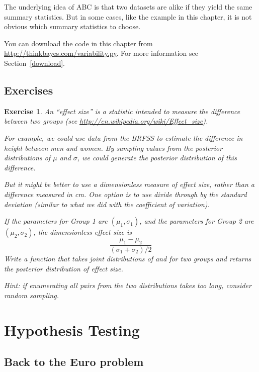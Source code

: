 \documentclass[12pt]{book}
\theoremstyle{exercise}
\newtheorem{exercise}{Exercise}[chapter]
\begin{document}
The underlying idea of ABC is that two datasets are alike if they yield
the same summary statistics.  But in some cases, like the example in
this chapter, it is not obvious which summary statistics to choose.

You can download the code in this chapter from
\url{http://thinkbayes.com/variability.py}.
  For more information
see Section~\ref{download}.

\section{Exercises}

\begin{exercise}

An ``effect size'' is a statistic intended to measure the difference
between two groups (see
\url{http://en.wikipedia.org/wiki/Effect_size}).

For example, we could use data from the BRFSS to estimate the
difference in height between men and women.  By sampling values
from the posterior distributions of $\mu$ and
$\sigma$, we could generate the posterior distribution of this
difference.

But it might be better to use a dimensionless measure of effect
size, rather than a difference measured in cm.  One option is
to use divide through by the standard deviation (similar to what
we did with the coefficient of variation).

If the parameters for Group 1 are $(\mu_1, \sigma_1)$, and the
parameters for Group 2 are $(\mu_2, \sigma_2)$, the dimensionless
effect size is
%
\[ \frac{\mu_1 - \mu_2}{(\sigma_1 + \sigma_2)/2} \]
%
Write a function that takes joint distributions of
 and  for two groups and returns
the posterior distribution of effect size.

Hint: if enumerating all pairs from the two distributions takes too
long, consider random sampling.

\end{exercise}



\chapter{Hypothesis Testing}
\label{hypotest}

\section{Back to the Euro problem}
\end{document}
